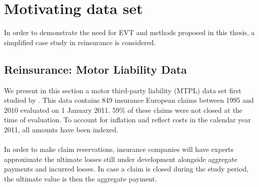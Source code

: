\section{Motivating data set}\label{mtplsection}
In order to demonstrate the need for EVT and methods proposed in this thesis, a simplified case study in reinsurance is considered. 
\subsection{Reinsurance: Motor Liability Data}
We present in this section a motor third-party liability (MTPL) data set first studied by \cite{albrecher2017reinsurance}.
This data contains 849 insurance European claims between 1995 and 2010 evaluated on 1 January 2011. 59\% of these claims were not closed at the time of evaluation. To account for inflation and reflect costs in the calendar year 2011, all amounts have been indexed.
\\\\
In order to make claim reservations, insurance companies will have experts approximate the ultimate losses still under development alongside aggregate payments and incurred losses. In case a claim is closed during the study period, the ultimate value is then the aggregate payment.
